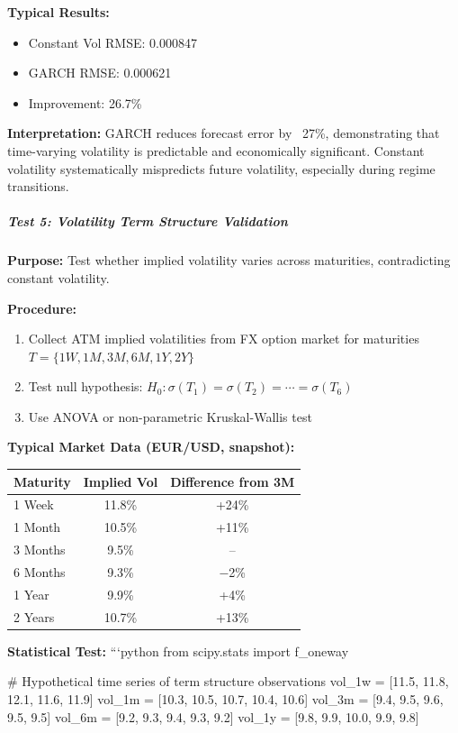 \textbf{Typical Results:}

\begin{itemize}
	\item Constant Vol RMSE: 0.000847
	\item GARCH RMSE: 0.000621
	\item Improvement: 26.7\%
\end{itemize}

\textbf{Interpretation:} GARCH reduces forecast error by ~27\%, demonstrating that time-varying volatility is predictable and economically significant. Constant volatility systematically mispredicts future volatility, especially during regime transitions.

\subparagraph{Test 5: Volatility Term Structure Validation}

\textbf{Purpose:} Test whether implied volatility varies across maturities, contradicting constant volatility.

\textbf{Procedure:}

\begin{enumerate}
	\item Collect ATM implied volatilities from FX option market for maturities $T = \{1W, 1M, 3M, 6M, 1Y, 2Y\}$
	\item Test null hypothesis: $H_0: \sigma(T_1) = \sigma(T_2) = \cdots = \sigma(T_6)$
	\item Use ANOVA or non-parametric Kruskal-Wallis test
\end{enumerate}

\textbf{Typical Market Data (EUR/USD, snapshot):}

\begin{center}
	\begin{tabular}{|l|c|c|}
		\hline
		\textbf{Maturity} & \textbf{Implied Vol} & \textbf{Difference from 3M} \\
		\hline
		1 Week & 11.8\% & +24\% \\
		1 Month & 10.5\% & +11\% \\
		3 Months & 9.5\% & -- \\
		6 Months & 9.3\% & $-$2\% \\
		1 Year & 9.9\% & +4\% \\
		2 Years & 10.7\% & +13\% \\
		\hline
	\end{tabular}
\end{center}

\textbf{Statistical Test:}
```python
from scipy.stats import f_oneway

# Hypothetical time series of term structure observations
vol_1w = [11.5, 11.8, 12.1, 11.6, 11.9]
vol_1m = [10.3, 10.5, 10.7, 10.4, 10.6]
vol_3m = [9.4, 9.5, 9.6, 9.5, 9.5]
vol_6m = [9.2, 9.3, 9.4, 9.3, 9.2]
vol_1y = [9.8, 9.9, 10.0, 9.9, 9.8]

